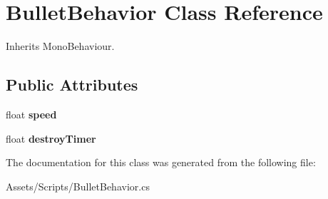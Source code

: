 \hypertarget{class_bullet_behavior}{}\section{Bullet\+Behavior Class Reference}
\label{class_bullet_behavior}


Inherits Mono\+Behaviour.

\subsection*{Public Attributes}
\begin{DoxyCompactItemize}
\item 
\mbox{\label{class_bullet_behavior_a96bc765df5aeef30e70dc9f37f262085}} 
float {\bfseries speed}
\item 
\mbox{\label{class_bullet_behavior_adb2cef52a17afe7fa373d944e87a15d3}} 
float {\bfseries destroy\+Timer}
\end{DoxyCompactItemize}


The documentation for this class was generated from the following file\+:\begin{DoxyCompactItemize}
\item 
Assets/\+Scripts/Bullet\+Behavior.\+cs\end{DoxyCompactItemize}
